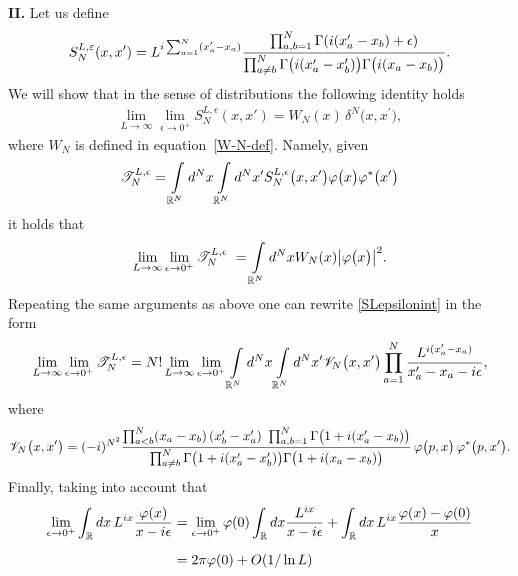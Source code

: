 \documentclass[11pt]{article}
\numberwithin{equation}{section}
\numberwithin{equation}{section}
\begin{document}
\noindent
{\bf II.} Let us define
\begin{gather*}
S_N^{L,\varepsilon}(x,x')=L^{{\rm i}\sum_{a=1}^{N}(x'_a-x_a)}\frac{\prod_{a,b=1}^{N} \Gamma({\rm i}(x'_a-x_b)+\epsilon)}{\prod_{ a \not= b }^{ N }
\Gamma\big({\rm i} (x_{a}^{\prime}-x_{b}^{\prime}) \big) \Gamma\big({\rm i} (x_{a}-x_{b}) \big)}.
\end{gather*}
We will show that in the sense of distributions the following identity holds
\begin{gather*}
\lim_{L\rightarrow\infty}\lim_{\epsilon\rightarrow 0^+}S_N^{L,\epsilon}(x,x')
 =W_N(x) \, \delta^{N}\big(x,x^{\prime} \big),
\end{gather*}
where $W_N$ is defined in equation~\eqref{W-N-def}. Namely, given
\begin{gather}
\mathscr{T}_N^{L,\epsilon} = \int\limits_{\mathbb{R}^{N}}{\rm d}^{N}x
\int\limits_{\mathbb{R}^{N}}{} {\rm d}^{N}x^{\prime}
{S}_N^{L,\epsilon}\big(x,x^{\prime} \big)
\varphi\big(x\big)\varphi^{*}\big(x^{\prime}\big)
\label{SLepsilonint}
\end{gather}
it holds that
\begin{gather*}
\lim_{L\rightarrow\infty}\lim_{\epsilon \rightarrow 0^+ } \mathscr{T}_N^{L,\epsilon}   =
 \int\limits_{\mathbb{R}^{N}}{} {\rm d}^{N}x W_N(x) \big| \varphi\big(x\big) \big|^2 .
\end{gather*}
Repeating the same arguments as above one can rewrite \eqref{SLepsilonint} in the form
\begin{gather*}
\lim_{L\rightarrow\infty}\lim_{ \epsilon\rightarrow 0^+ } \mathscr{T}_N^{L,\epsilon} =
 N! \lim_{L\rightarrow\infty}\lim_{ \epsilon\rightarrow 0^+ }
 \int\limits_{\mathbb{R}^{N}}{} {\rm d}^{N}x
\int\limits_{\mathbb{R}^{N}}{} {\rm d}^{N}x^{\prime} \mathscr{V}_N \big(x,x^{\prime} \big)
\prod\limits_{a=1}^{N} \frac{ L^{{\rm i}(x'_a-x_a)} }{ x^{\prime}_a - x_a -{\rm i} \epsilon },
\end{gather*}
where
\begin{gather*}
\mathscr{V}_N\big(x,x^{\prime} \big) =(-{\rm i})^{N^2}
 \frac{ \prod_{a<b}^{N} (x_{a}-x_{b})\, (x_{b}^{\prime}-x_{a}^{\prime}) 
 \prod_{a,b=1}^{N}\Gamma\big(1+{\rm i}(x'_a-x_b)\big)}{\prod_{ a \not= b }^{ N }
\Gamma\big( 1+{\rm i} (x_{a}^{\prime}-x_{b}^{\prime}) \big) \Gamma\big( 1+{\rm i} (x_{a}-x_{b}) \big)}\,
\varphi\big(p,x\big) \, \varphi^{*}\big(p,x^{\prime}\big).
\end{gather*}
Finally, taking into account that
\begin{align*}
\lim_{\epsilon\rightarrow 0^+}\int_{\mathbb R} {\rm d}x\, L^{{\rm i}x}\frac{\varphi(x)}{x-{\rm i}\epsilon} & =
\lim_{\epsilon\rightarrow 0^+}\varphi(0)\int_{\mathbb R} {\rm d}x \frac{L^{{\rm i}x}}{x-{\rm i}\epsilon}
 + \int_{\mathbb R} {\rm d}x\, L^{{\rm i}x}\frac{\varphi(x)-\varphi(0)}{x}\notag
\\[2mm]
&=2\pi\varphi(0) + O(1/\ln L)
\end{align*}
\end{document}
